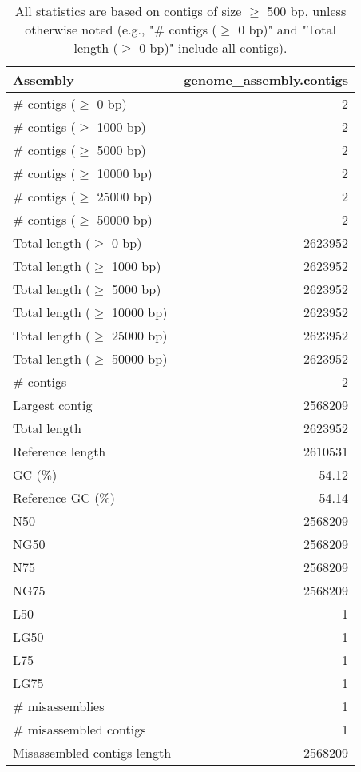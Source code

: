 \documentclass[12pt,a4paper]{article}
\begin{document}
\begin{table}[ht]
\begin{center}
\caption{All statistics are based on contigs of size $\geq$ 500 bp, unless otherwise noted (e.g., "\# contigs ($\geq$ 0 bp)" and "Total length ($\geq$ 0 bp)" include all contigs).}
\begin{tabular}{|l*{1}{|r}|}
\hline
Assembly & genome\_assembly.contigs \\ \hline
\# contigs ($\geq$ 0 bp) & 2 \\ \hline
\# contigs ($\geq$ 1000 bp) & 2 \\ \hline
\# contigs ($\geq$ 5000 bp) & 2 \\ \hline
\# contigs ($\geq$ 10000 bp) & 2 \\ \hline
\# contigs ($\geq$ 25000 bp) & 2 \\ \hline
\# contigs ($\geq$ 50000 bp) & 2 \\ \hline
Total length ($\geq$ 0 bp) & 2623952 \\ \hline
Total length ($\geq$ 1000 bp) & 2623952 \\ \hline
Total length ($\geq$ 5000 bp) & 2623952 \\ \hline
Total length ($\geq$ 10000 bp) & 2623952 \\ \hline
Total length ($\geq$ 25000 bp) & 2623952 \\ \hline
Total length ($\geq$ 50000 bp) & 2623952 \\ \hline
\# contigs & 2 \\ \hline
Largest contig & 2568209 \\ \hline
Total length & 2623952 \\ \hline
Reference length & 2610531 \\ \hline
GC (\%) & 54.12 \\ \hline
Reference GC (\%) & 54.14 \\ \hline
N50 & 2568209 \\ \hline
NG50 & 2568209 \\ \hline
N75 & 2568209 \\ \hline
NG75 & 2568209 \\ \hline
L50 & 1 \\ \hline
LG50 & 1 \\ \hline
L75 & 1 \\ \hline
LG75 & 1 \\ \hline
\# misassemblies & 1 \\ \hline
\# misassembled contigs & 1 \\ \hline
Misassembled contigs length & 2568209 \\ \hline

\end{tabular}
\end{center}
\end{table}
\end{document}
